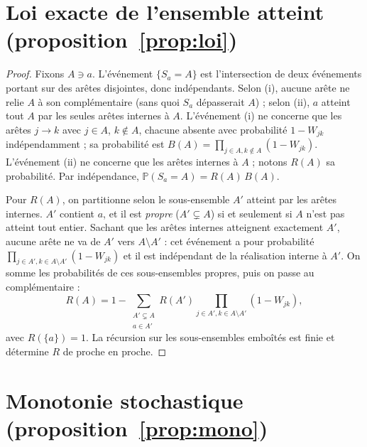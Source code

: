\section*{Loi exacte de l'ensemble atteint (proposition~\ref{prop:loi})}

\begin{proof}
Fixons $A\ni a$. L'événement $\{S_a=A\}$ est l'intersection de deux événements portant sur des
arêtes disjointes, donc indépendants. Selon (i), aucune arête ne relie $A$ à son complémentaire (sans
quoi $S_a$ dépasserait $A$) ; selon (ii), $a$ atteint tout $A$ par les seules arêtes internes à $A$.
L'événement (i) ne concerne que les arêtes $j\to k$ avec $j\in A$, $k\notin A$, chacune absente
avec probabilité $1-W_{jk}$ indépendamment ; sa probabilité est $B(A)=\prod_{j\in A,k\notin A}(1-W_{jk})$.
L'événement (ii) ne concerne que les arêtes internes à $A$ ; notons $R(A)$ sa probabilité.
Par indépendance, $\mathbb P(S_a=A)=R(A)\,B(A)$.

Pour $R(A)$, on partitionne selon le sous-ensemble $A'$ atteint par les arêtes internes. $A'$
contient $a$, et il est \emph{propre} ($A'\subsetneq A$) si et seulement si $A$ n'est pas atteint
tout entier. Sachant que les arêtes internes atteignent exactement $A'$, aucune arête ne va de $A'$
vers $A\setminus A'$ : cet événement a pour probabilité
$\prod_{j\in A',k\in A\setminus A'}(1-W_{jk})$ et il est indépendant de la réalisation interne à
$A'$. On somme les probabilités de ces sous-ensembles propres, puis on passe au complémentaire :
\[
  R(A)=1-\sum_{\substack{A'\subsetneq A\\ a\in A'}} R(A')\!\!\prod_{j\in A',k\in A\setminus A'}\!\!(1-W_{jk}),
\]
avec $R(\{a\})=1$. La récursion sur les sous-ensembles emboîtés est finie et détermine $R$ de
proche en proche.
\end{proof}

\section*{Monotonie stochastique (proposition~\ref{prop:mono})}

